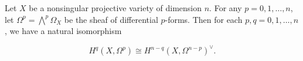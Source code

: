 Let $X$ be a nonsingular projective variety of dimension $n$. For any $p = 0, 1, \ldots, n$, let $\Omega^p = \bigwedge^p \Omega_X$ be the sheaf of differential $p$-forms. Then for each $p, q = 0, 1, \ldots, n$, we have a natural isomorphism

$$H^q(X, \Omega^p) \cong H^{n-q}(X, \Omega^{n-p})^\vee.$$
